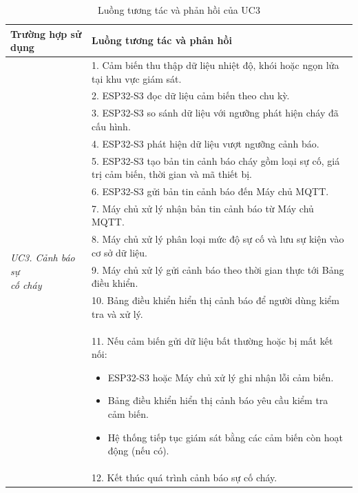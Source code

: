 \documentclass[a4paper,12pt]{article}
\begin{document}
\begin{table}[H]
\centering
\small
\caption{Luồng tương tác và phản hồi của UC3}
\begin{tabularx}{\linewidth}{|p{4cm}|X|}
\hline
\textbf{Trường hợp sử dụng} &
\textbf{Luồng tương tác và phản hồi} \\
\hline

\multirow{13}{=}{\parbox{3.2cm}{\centering\textit{UC3. Cảnh báo sự\\cố cháy}}}
&
1. Cảm biến thu thập dữ liệu nhiệt độ, khói hoặc ngọn lửa tại khu vực giám sát. \\

&
2. ESP32-S3 đọc dữ liệu cảm biến theo chu kỳ. \\

&
3. ESP32-S3 so sánh dữ liệu với ngưỡng phát hiện cháy đã cấu hình. \\

&
4. ESP32-S3 phát hiện dữ liệu vượt ngưỡng cảnh báo. \\

&
5. ESP32-S3 tạo bản tin cảnh báo cháy gồm loại sự cố, giá trị cảm biến, thời gian và mã thiết bị. \\

&
6. ESP32-S3 gửi bản tin cảnh báo đến Máy chủ MQTT. \\

&
7. Máy chủ xử lý nhận bản tin cảnh báo từ Máy chủ MQTT. \\

&
8. Máy chủ xử lý phân loại mức độ sự cố và lưu sự kiện vào cơ sở dữ liệu. \\

&
9. Máy chủ xử lý gửi cảnh báo theo thời gian thực tới Bảng điều khiển. \\

&
10. Bảng điều khiển hiển thị cảnh báo để người dùng kiểm tra và xử lý. \\

&
11. Nếu cảm biến gửi dữ liệu bất thường hoặc bị mất kết nối:
\begin{itemize}
    \item ESP32-S3 hoặc Máy chủ xử lý ghi nhận lỗi cảm biến.
    \item Bảng điều khiển hiển thị cảnh báo yêu cầu kiểm tra cảm biến.
    \item Hệ thống tiếp tục giám sát bằng các cảm biến còn hoạt động (nếu có).
\end{itemize}
\\

&
12. Kết thúc quá trình cảnh báo sự cố cháy. \\
\hline

\end{tabularx}
\end{table}
\end{document}
